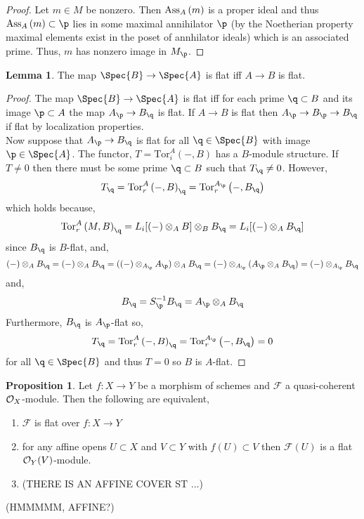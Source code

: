 \documentclass[12pt]{extarticle}
\theoremstyle{definition}
\newtheorem{lemma}[theorem]{Lemma}
\newtheorem{proposition}[theorem]{Proposition}
\newcommand{\Tor}[4]{\mathrm{Tor}^{#1}_{#2} \left( #3, #4 \right)}
\newcommand{\F}{\mathcal{F}}
\begin{document}
\begin{proof}
Let $m \in M$ be nonzero. Then $\mathrm{Ass}_{A} \left( m \right)$ is a proper ideal and thus $\Ass{A}{m} \subset \p$ lies in some maximal annihilator $\p$ (by the Noetherian property maximal elements exist in the poset of annhilator ideals) which is an associated prime. Thus, $m$ has nonzero image in $M_\p$.  
\end{proof}

\begin{lemma}
The map $\Spec{B} \to \Spec{A}$ is flat iff $A \to B$ is flat.
\end{lemma}

\begin{proof}
The map $\Spec{B} \to \Spec{A}$ is flat iff for each prime $\q \subset B$ and its image $\p \subset A$ the map $A_\p \to B_{\q}$ is flat. If $A \to B$ is flat then $A_\p \to B_\p \to B_\q$ if flat by localization properties.
 \bigskip\\
Now suppose that $A_\p \to B_\q$ is flat for all $\q \in \Spec{B}$ with image $\p \in \Spec{A}$. 
The functor, $T = \Tor{A}{i}{-}{B}$ has a $B$-module structure. If $T \neq 0$ then there must be some prime $\q \subset B$ such that $T_\q \neq 0$. However,
\[ T_\q = \Tor{A}{r}{-}{B}_\q = \Tor{A_\p}{r}{-}{B_\q} \]
which holds because,
\[ \Tor{A}{r}{M}{B}_\q = L_i [(-) \otimes_ A B] \otimes_B B_\q = L_i [ (-) \otimes_A B_\q ] \]
since $B_\q$ is $B$-flat, and,
\[ (-) \otimes_A B_\q = (-) \otimes_A B_\q = ((-) \otimes_{A_\p} A_\p) \otimes_A B_\q = (-) \otimes_{A_\p} (A_\p \otimes_A B_\q) = (-) \otimes_{A_\p} B_\q \]
and,
\[ B_\q = S^{-1}_\p B_\q = A_\p \otimes_A B_\q \]
Furthermore, $B_\q$ is $A_\p$-flat so,
\[ T_\q = \Tor{A}{r}{-}{B}_\q = \Tor{A_\p}{r}{-}{B_\q} = 0 \]
for all $\q \in \Spec{B}$ and thus $T = 0$ so $B$ is $A$-flat. 
\end{proof}

\begin{proposition}
Let $f : X \to Y$ be a morphism of schemes and $\F$ a quasi-coherent $\mathcal{O}_{X}$-module. Then the following are equivalent,
\begin{enumerate}
\item $\F$ is flat over $f : X \to Y$
\item for any affine opens $U \subset X$ and $V \subset Y$ with $f(U) \subset V$ then $\F(U)$ is a flat $\mathcal{O}_{Y}(V)$-module. 
\item (THERE IS AN AFFINE COVER ST ...)
\end{enumerate}
(HMMMMM, AFFINE?)
\end{proposition}
\end{document}
